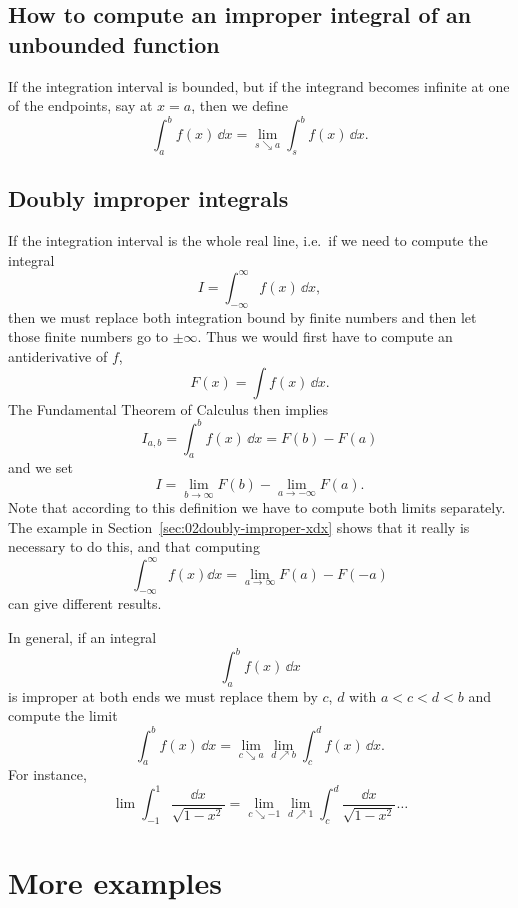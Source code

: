 \subsection{How to compute an improper integral of an unbounded function} %
If the integration interval is bounded, but if the integrand becomes infinite at
one of the endpoints, say at $x=a$, then we define
\begin{equation}
  \label{eq:01improper-integral-def2}
  \int_a^b f(x)\, \dd x = \lim_{s\searrow a} \int_s^bf(x)\,\dd x.
\end{equation}

\subsection{Doubly improper integrals} %
If the integration interval is the whole real line, i.e.~if we need to compute
the integral
\[
  I = \int_{-\infty}^\infty f(x) \,\dd x,
\]
then we must replace both integration bound by finite numbers and then let those
finite numbers go to $\pm\infty$.  Thus we would first have to compute an
antiderivative of $f$,
\[
F(x) = \int f(x)\,\dd x.
\]
The Fundamental Theorem of Calculus then implies 
\[
I_{a, b} = \int_a^b f(x) \,\dd x = F(b) - F(a)
\]
and we set
\[
I = \lim_{b\to \infty}F(b) - \lim_{a\to-\infty} F(a).
\]
Note that according to this definition we have to compute both limits
separately.  The example in Section~\ref{sec:02doubly-improper-xdx} shows that
it really is necessary to do this, and that computing
\[
\int_{-\infty}^\infty f(x) \dd x = \lim_{a\to\infty} F(a) - F(-a)
\]
can give different results.

In general, if an integral
\[
\int _a ^b f(x)\,\dd x
\]
is improper at both ends we must replace them by $c$, $d$ with $a<c<d<b$ and
compute the limit
\[
\int_a^b f(x) \, \dd x
=
\lim_{c\searrow a} \lim_{d \nearrow b} \int_c^d f(x) \,\dd x.
\]
For instance,
\[
\lim\int_{-1}^1 \frac{\dd x} {\sqrt{1-x^2}}
= \lim_{c\searrow -1}\lim_{d\nearrow 1}
     \int_c^d \frac{\dd x} {\sqrt{1-x^2}}\dots %
\]

\section{More examples} %

